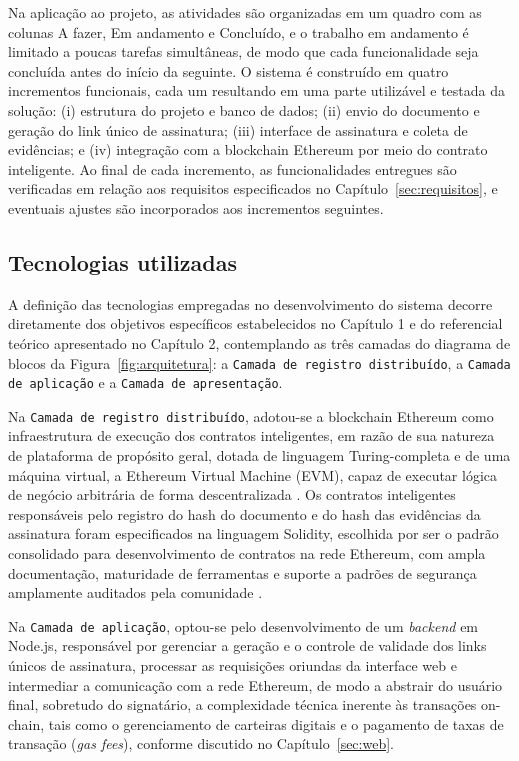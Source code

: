 \documentclass[
    12pt,
    a4paper,
    oneside,
    chapter=TITLE,
    section=TITLE,
    subsection=TITLE,
    subsubsection=TITLE,
    sumario=tradicional,
    english,
    brazil
]{abntex2}
\newcommand{\elem}[1]{\texttt{#1}}
\begin{document}
Na aplicação ao projeto, as atividades são organizadas em um quadro com as colunas A fazer, Em andamento e Concluído, e o trabalho em andamento é limitado a poucas tarefas simultâneas, de modo que cada funcionalidade seja concluída antes do início da seguinte. O sistema é construído em quatro incrementos funcionais, cada um resultando em uma parte utilizável e testada da solução: (i) estrutura do projeto e banco de dados; (ii) envio do documento e geração do link único de assinatura; (iii) interface de assinatura e coleta de evidências; e (iv) integração com a blockchain Ethereum por meio do contrato inteligente. Ao final de cada incremento, as funcionalidades entregues são verificadas em relação aos requisitos especificados no Capítulo~\ref{sec:requisitos}, e eventuais ajustes são incorporados aos incrementos seguintes.

\subsection{Tecnologias utilizadas}

A definição das tecnologias empregadas no desenvolvimento do sistema decorre diretamente dos objetivos específicos estabelecidos no Capítulo 1 e do referencial teórico apresentado no Capítulo 2, contemplando as três camadas do diagrama de blocos da Figura~\ref{fig:arquitetura}: a \elem{Camada de registro distribuído}, a \elem{Camada de aplicação} e a \elem{Camada de apresentação}.

Na \elem{Camada de registro distribuído}, adotou-se a blockchain Ethereum como infraestrutura de execução dos contratos inteligentes, em razão de sua natureza de plataforma de propósito geral, dotada de linguagem Turing-completa e de uma máquina virtual, a Ethereum Virtual Machine (EVM), capaz de executar lógica de negócio arbitrária de forma descentralizada \cite{buterin2014}. Os contratos inteligentes responsáveis pelo registro do hash do documento e do hash das evidências da assinatura foram especificados na linguagem Solidity, escolhida por ser o padrão consolidado para desenvolvimento de contratos na rede Ethereum, com ampla documentação, maturidade de ferramentas e suporte a padrões de segurança amplamente auditados pela comunidade \cite{alharby2017}.

Na \elem{Camada de aplicação}, optou-se pelo desenvolvimento de um \emph{backend} em Node.js, responsável por gerenciar a geração e o controle de validade dos links únicos de assinatura, processar as requisições oriundas da interface web e intermediar a comunicação com a rede Ethereum, de modo a abstrair do usuário final, sobretudo do signatário, a complexidade técnica inerente às transações on-chain, tais como o gerenciamento de carteiras digitais e o pagamento de taxas de transação (\emph{gas fees}), conforme discutido no Capítulo~\ref{sec:web}.
\end{document}
